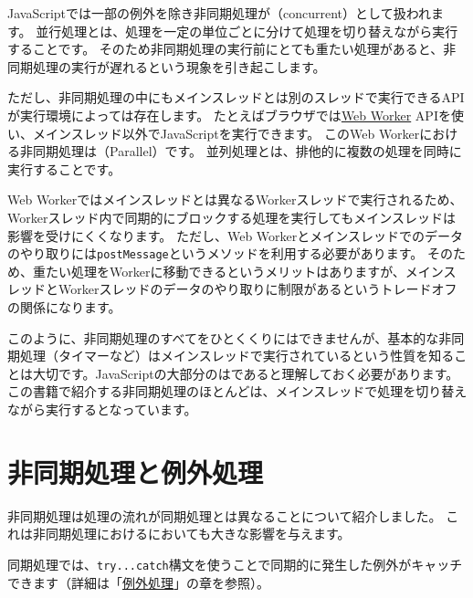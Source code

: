 JavaScriptでは一部の例外を除き非同期処理が\textbf{}（concurrent）として扱われます。
並行処理とは、処理を一定の単位ごとに分けて処理を切り替えながら実行することです。
そのため非同期処理の実行前にとても重たい処理があると、非同期処理の実行が遅れるという現象を引き起こします。

ただし、非同期処理の中にもメインスレッドとは別のスレッドで実行できるAPIが実行環境によっては存在します。
たとえばブラウザでは\href{https://developer.mozilla.org/ja/docs/Web/API/Web_Workers_API/Using_web_workers}{Web
Worker} APIを使い、メインスレッド以外でJavaScriptを実行できます。
このWeb Workerにおける非同期処理は\textbf{}（Parallel）です。
並列処理とは、排他的に複数の処理を同時に実行することです。

Web Workerではメインスレッドとは異なるWorkerスレッドで実行されるため、Workerスレッド内で同期的にブロックする処理を実行してもメインスレッドは影響を受けにくくなります。
ただし、Web Workerとメインスレッドでのデータのやり取りには\texttt{postMessage}というメソッドを利用する必要があります。
そのため、重たい処理をWorkerに移動できるというメリットはありますが、メインスレッドとWorkerスレッドのデータのやり取りに制限があるというトレードオフの関係になります。

このように、非同期処理のすべてをひとくくりにはできませんが、基本的な非同期処理（タイマーなど）はメインスレッドで実行されているという性質を知ることは大切です。JavaScriptの大部分の\textbf{}は\textbf{}であると理解しておく必要があります。
この書籍で紹介する非同期処理のほとんどは、メインスレッドで処理を切り替えながら実行する\textbf{}となっています。

\hypertarget{async-processing-and-error-handling}{%
\section{非同期処理と例外処理}\label{async-processing-and-error-handling}}

非同期処理は処理の流れが同期処理とは異なることについて紹介しました。
これは非同期処理における\textbf{}においても大きな影響を与えます。

同期処理では、\texttt{try...catch}構文を使うことで同期的に発生した例外がキャッチできます（詳細は「\hyperlink{error-handling}{例外処理}」の章を参照）。


